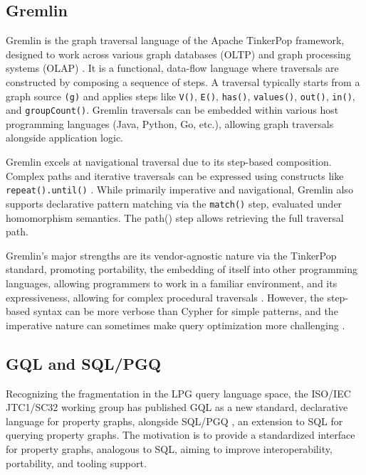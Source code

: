 \documentclass[sigconf,natbib=false]{acmart}
\begin{document}
\subsection{Gremlin}

Gremlin is the graph traversal language of the Apache TinkerPop framework, designed to work across various graph databases (OLTP) and graph processing systems (OLAP) \cite{ApacheTinkerPopGremlin}.
It is a functional, data-flow language where traversals are constructed by composing a sequence of steps.
A traversal typically starts from a graph source \texttt{(g)} and applies steps like \texttt{V()}, \texttt{E()}, \texttt{has()}, \texttt{values()}, \texttt{out()}, \texttt{in()}, and \texttt{groupCount()}.
Gremlin traversals can be embedded within various host programming languages (Java, Python, Go, etc.), allowing graph traversals alongside application logic.

Gremlin excels at navigational traversal due to its step-based composition.
Complex paths and iterative traversals can be expressed using constructs like \texttt{repeat().until()} \cite{angles2018FoundationsModernQuery}.
While primarily imperative and navigational, Gremlin also supports declarative pattern matching via the \texttt{match()} step, evaluated under homomorphism semantics.
The path() step allows retrieving the full traversal path.

Gremlin's major strengths are its vendor-agnostic nature via the TinkerPop standard, promoting portability, the embedding of itself into other programming languages, allowing programmers to work in a familiar environment, and its expressiveness, allowing for complex procedural traversals \cite{angles2018FoundationsModernQuery}.
However, the step-based syntax can be more verbose than Cypher for simple patterns, and the imperative nature can sometimes make query optimization more challenging \cite{liu2020LargescaleGraphProcessing}.

\subsection{GQL and SQL/PGQ}

Recognizing the fragmentation in the LPG query language space, the ISO/IEC JTC1/SC32 working group has published GQL \cite{ISOIECGQL} as a new standard, declarative language for property graphs, alongside SQL/PGQ \cite{ISOIECSQL}, an extension to SQL for querying property graphs.
The motivation is to provide a standardized interface for property graphs, analogous to SQL, aiming to improve interoperability, portability, and tooling support.
\end{document}
